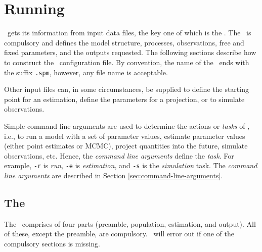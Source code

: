 \section{Running \SPM\label{sec:running-spm}}

\SPM\ gets its information from input data files, the key one of which is the \config{}. The \config\ is compulsory and defines the model structure, processes, observations, free and fixed parameters, and the outputs requested. The following sections  describe how to construct the \SPM\ configuration file. By convention, the name of the \config\ ends with the suffix \texttt{.spm}, however, any file name is acceptable.

Other input files can, in some circumstances, be supplied to define the starting point for an estimation, define the parameters for a projection, or to simulate observations.  

Simple command line arguments are used to determine the actions or \emph{tasks} of \SPM, i.e., to run a model with a set of parameter values, estimate parameter values (either point estimates or MCMC), project quantities into the future, simulate observations, etc. Hence, the \emph{command line arguments} define the \emph{task}. For example, \texttt{-r} is \emph{run}, \texttt{-e} is \emph{estimation}, and \texttt{-s} is the \emph{simulation} task. The \emph{command line arguments} are described in Section \ref{sec:command-line-arguments}.

\subsection{The \config\label{sec:config-files}}

The \config\ comprises of four parts (preamble, population, estimation, and output). All of these, except the preamble, are compulsory. \SPM\ will error out if one of the compulsory sections is missing.

